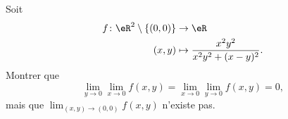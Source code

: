 \begin{exercice}[\minsyndical]\label{exoLimiteContinue0003}

 Soit 
 \begin{equation}
	 \begin{aligned}
		 f\colon \eR^2\setminus\{ (0,0) \}&\to \eR \\
		 (x,y)&\mapsto  \frac{x^2y^2}{x^2y^2 + (x-y)^2} .
	 \end{aligned}
 \end{equation}
Montrer que  
\begin{equation}
	\lim_{y\to 0}\lim_{x\to 0}f(x,y) =  \lim_{x\to 0}\lim_{y\to 0}f(x,y) = 0,
\end{equation}
mais que $ \lim_{(x,y)\to (0,0)} f(x,y)$ n'existe pas. 

\end{exercice}
